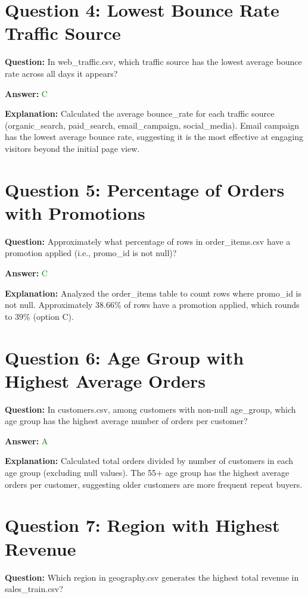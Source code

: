 \documentclass{article}
\begin{document}
\bigskip

\section*{Question 4: Lowest Bounce Rate Traffic Source}
\textbf{Question:} In web\_traffic.csv, which traffic source has the lowest average bounce rate across all days it appears?

\textbf{Answer:} \textcolor{green}{C}

\textbf{Explanation:} Calculated the average bounce\_rate for each traffic source (organic\_search, paid\_search, email\_campaign, social\_media). Email campaign has the lowest average bounce rate, suggesting it is the most effective at engaging visitors beyond the initial page view.

\bigskip

\section*{Question 5: Percentage of Orders with Promotions}
\textbf{Question:} Approximately what percentage of rows in order\_items.csv have a promotion applied (i.e., promo\_id is not null)?

\textbf{Answer:} \textcolor{green}{C}

\textbf{Explanation:} Analyzed the order\_items table to count rows where promo\_id is not null. Approximately 38.66\% of rows have a promotion applied, which rounds to 39\% (option C).

\bigskip

\section*{Question 6: Age Group with Highest Average Orders}
\textbf{Question:} In customers.csv, among customers with non-null age\_group, which age group has the highest average number of orders per customer?

\textbf{Answer:} \textcolor{green}{A}

\textbf{Explanation:} Calculated total orders divided by number of customers in each age group (excluding null values). The 55+ age group has the highest average orders per customer, suggesting older customers are more frequent repeat buyers.

\bigskip

\section*{Question 7: Region with Highest Revenue}
\textbf{Question:} Which region in geography.csv generates the highest total revenue in sales\_train.csv?
\end{document}
